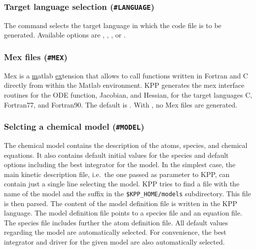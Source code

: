 \documentclass[twoside]{article}
\begin{document}
\subsubsection{Target language selection ({\tt\#LANGUAGE})}
\label{sec:command-language}

The  command selects the target language in which the
code file is to be generated. Available options are ,
, , or .

\subsubsection{Mex files ({\tt\#MEX})}
\label{sec:command-mex}

Mex is a \underline{m}atlab \underline{ex}tension that allows to call
functions written in Fortran and C directly from within the Matlab
environment. KPP generates the mex interface routines for the ODE
function, Jacobian, and Hessian, for the target languages C, Fortran77,
and Fortran90.  The default is . With , no Mex files
are generated.

\subsubsection{Selcting a chemical model ({\tt\#MODEL})}
\label{sec:command-model}

The chemical model contains the description of the atoms, species, and
chemical equations. It also contains default initial values for the
species and default options including the best integrator for the model.
In the simplest case, the main kinetic description file, i.e.\ the one
passed as parameter to KPP, can contain just a single line selecting the
model. KPP tries to find a file with the name of the model and the
suffix  in the \verb|$KPP_HOME/models| subdirectory. This
file is then parsed. The content of the model definition file is written
in the KPP language. The model definition file points to a species file
and an equation file. The species file includes further the atom
definition file. All default values regarding the model are
automatically selected. For convenience, the best integrator and driver
for the given model are
also automatically selected. %
\end{document}
